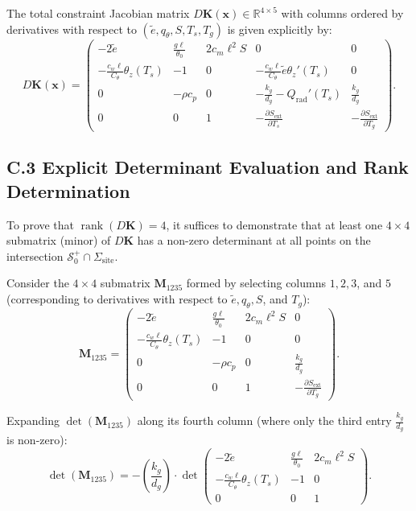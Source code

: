 The total constraint Jacobian matrix $D\mathbf{K}(\mathbf{x}) \in \mathbb{R}^{4 \times 5}$ with columns ordered by derivatives with respect to $(\tilde e, q_\theta, S, T_s, T_g)$ is given explicitly by:
\begin{equation}
D\mathbf{K}(\mathbf{x}) =
\begin{pmatrix}
-2\tilde e & \frac{g\ell}{\theta_0} & 2 c_m \ell^2 S & 0 & 0 \\[6pt]
-\frac{c_w \ell}{C_\theta}\theta_z(T_s) & -1 & 0 & -\frac{c_w \ell}{C_\theta}\tilde e \theta_z'(T_s) & 0 \\[6pt]
0 & -\rho c_p & 0 & -\frac{k_g}{d_g} - Q_{\mathrm{rad}}'(T_s) & \frac{k_g}{d_g} \\[6pt]
0 & 0 & 1 & -\frac{\partial S_{\mathrm{ext}}}{\partial T_s} & -\frac{\partial S_{\mathrm{ext}}}{\partial T_g}
\end{pmatrix}.
\label{eq:combined_jacobian}
\end{equation}

\subsection*{C.3 Explicit Determinant Evaluation and Rank Determination}

To prove that $\operatorname{rank}(D\mathbf{K}) = 4$, it suffices to demonstrate that at least one $4 \times 4$ submatrix (minor) of $D\mathbf{K}$ has a non-zero determinant at all points on the intersection $\mathcal{S}_0^+ \cap \Sigma_{\mathrm{site}}$.

Consider the $4 \times 4$ submatrix $\mathbf{M}_{1235}$ formed by selecting columns $1, 2, 3$, and $5$ (corresponding to derivatives with respect to $\tilde e, q_\theta, S$, and $T_g$):
\begin{equation}
\mathbf{M}_{1235} =
\begin{pmatrix}
-2\tilde e & \frac{g\ell}{\theta_0} & 2 c_m \ell^2 S & 0 \\[6pt]
-\frac{c_w \ell}{C_\theta}\theta_z(T_s) & -1 & 0 & 0 \\[6pt]
0 & -\rho c_p & 0 & \frac{k_g}{d_g} \\[6pt]
0 & 0 & 1 & -\frac{\partial S_{\mathrm{ext}}}{\partial T_g}
\end{pmatrix}.
\end{equation}

Expanding $\det(\mathbf{M}_{1235})$ along its fourth column (where only the third entry $\frac{k_g}{d_g}$ is non-zero):
\begin{equation}
\det(\mathbf{M}_{1235}) = - \left( \frac{k_g}{d_g} \right) \cdot \det
\begin{pmatrix}
-2\tilde e & \frac{g\ell}{\theta_0} & 2 c_m \ell^2 S \\[6pt]
-\frac{c_w \ell}{C_\theta}\theta_z(T_s) & -1 & 0 \\[6pt]
0 & 0 & 1
\end{pmatrix}.
\label{eq:minor_exp_1}
\end{equation}

